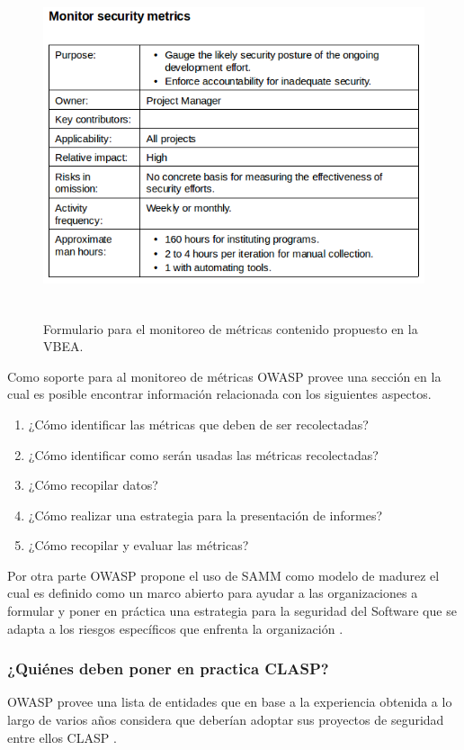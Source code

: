 \documentclass[runningheads,a4paper]{llncs}
\begin{document}
\begin{figure}
\centering
\includegraphics[height=10.0cm, width=12.0cm]{sa_figura_14}
\caption{Formulario para el monitoreo de métricas contenido propuesto en la \gls{VBEA}.}
\label{fig:example}
\end{figure}

Como soporte para al monitoreo de métricas \gls{OWASP} provee una sección en la cual es posible encontrar información relacionada con los siguientes aspectos.

\begin{enumerate}
	\item ¿Cómo identificar las métricas que deben de ser recolectadas?
	\item ¿Cómo identificar como serán usadas las métricas recolectadas?
	\item ¿Cómo recopilar datos?
	\item ¿Cómo realizar una estrategia para la presentación de informes?
	\item ¿Cómo recopilar y evaluar las métricas?\\
	
\end{enumerate} 
Por otra parte \gls{OWASP} propone el uso de \gls{SAMM} como modelo de madurez el cual es definido como un marco abierto para ayudar a las organizaciones a formular y poner en práctica una estrategia para la seguridad del \gls{Software} que se adapta a los riesgos específicos que enfrenta la organización \cite{SAMMIntroduction}.


\subsubsection{¿Quiénes deben poner en practica \gls{CLASP}?}
\gls{OWASP} provee una lista de entidades que en base a la experiencia obtenida a lo largo de varios años considera que deberían adoptar sus proyectos de seguridad entre ellos \gls{CLASP} \cite{OWASPIntroduction}.\\
\end{document}
